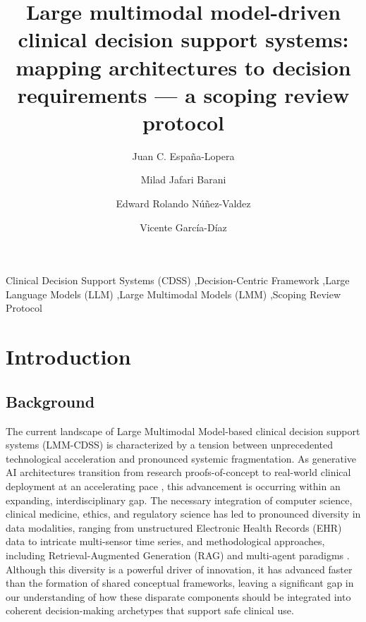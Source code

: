 \documentclass[review,12pt]{elsarticle}
\begin{document}
\begin{frontmatter}


\title{Large multimodal model-driven clinical decision support systems: mapping architectures to decision requirements — a scoping review protocol } %

\author[unioviedo]{Juan C. España-Lopera} 
\author[unioviedo]{Milad Jafari Barani} 
\author[unioviedo]{Edward Rolando Núñez-Valdez}
\author[unioviedo]{Vicente García-Díaz}






\begin{keyword}
Clinical Decision Support Systems (CDSS) \sep Decision-Centric Framework \sep Large Language Models (LLM) \sep Large Multimodal Models (LMM) \sep Scoping Review Protocol
\end{keyword}

\end{frontmatter}

\section{Introduction}
\label{intro}

\subsection{Background}

The current landscape of Large Multimodal Model-based clinical decision support systems (LMM-CDSS) is characterized by a tension between unprecedented technological acceleration and pronounced systemic fragmentation. As generative AI architectures transition from research proofs-of-concept to real-world clinical deployment at an accelerating pace \cite{Maity2025, Bajwa2021}, this advancement is occurring within an expanding, interdisciplinary gap. The necessary integration of computer science, clinical medicine, ethics, and regulatory science \cite{Markus2021, Sadeghi2024} has led to pronounced diversity in data modalities,  ranging from unstructured Electronic Health Records (EHR) data to intricate multi-sensor time series, and methodological approaches, including Retrieval-Augmented Generation (RAG) and multi-agent paradigms \cite{Maity2025, Albahri2020}. Although this diversity is a powerful driver of innovation, it has advanced faster than the formation of shared conceptual frameworks, leaving a significant gap in our understanding of how these disparate components should be integrated into coherent decision-making archetypes that support safe clinical use.
\end{document}
